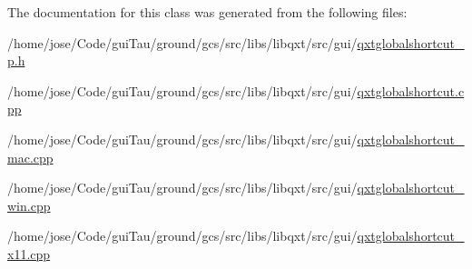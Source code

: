 The documentation for this class was generated from the following files\-:\begin{DoxyCompactItemize}
\item 
/home/jose/\-Code/gui\-Tau/ground/gcs/src/libs/libqxt/src/gui/\hyperlink{qxtglobalshortcut__p_8h}{qxtglobalshortcut\-\_\-p.\-h}\item 
/home/jose/\-Code/gui\-Tau/ground/gcs/src/libs/libqxt/src/gui/\hyperlink{qxtglobalshortcut_8cpp}{qxtglobalshortcut.\-cpp}\item 
/home/jose/\-Code/gui\-Tau/ground/gcs/src/libs/libqxt/src/gui/\hyperlink{qxtglobalshortcut__mac_8cpp}{qxtglobalshortcut\-\_\-mac.\-cpp}\item 
/home/jose/\-Code/gui\-Tau/ground/gcs/src/libs/libqxt/src/gui/\hyperlink{qxtglobalshortcut__win_8cpp}{qxtglobalshortcut\-\_\-win.\-cpp}\item 
/home/jose/\-Code/gui\-Tau/ground/gcs/src/libs/libqxt/src/gui/\hyperlink{qxtglobalshortcut__x11_8cpp}{qxtglobalshortcut\-\_\-x11.\-cpp}\end{DoxyCompactItemize}
